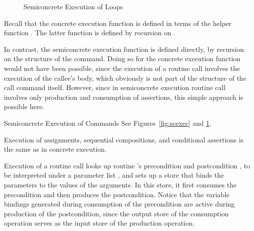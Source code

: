 \documentclass{CSML}
\theoremstyle{definition}\newtheorem{notation}[thm]{Notation}
\theoremstyle{plain}\newtheorem{satz}[thm]{Satz}
\begin{document}
\begin{figure}

\caption{Semiconcrete Execution of Loops}\label{fig:scexec-while}
\end{figure}

Recall that the concrete execution function  is 
defined in terms of the helper function . The 
latter function is defined by recursion on .

In contrast, the semiconcrete execution function 
 is defined directly, by recursion on the 
structure of the command. Doing so for the concrete execution 
function would not have been possible, since the execution of a 
routine call involves the execution of the callee's body, which 
obviously is not part of the structure of the call command 
itself. However, since in semiconcrete execution routine call 
involves only production and consumption of assertions, this 
simple approach is possible here.

\begin{defi}{Semiconcrete Execution of Commands}
See Figures~\ref{fig:scexec} and \ref{fig:scexec-while}.
\end{defi}

Execution of assignments, sequential compositions, and 
conditional assertions is the same as in concrete execution.

Execution of a routine call  looks up routine 
's precondition  and postcondition , to be 
interpreted under a parameter list , and sets up 
a store that binds the parameters to the values of the 
arguments. In this store, it first consumes the precondition 
and then produces the postcondition. Notice that the variable 
bindings generated during consumption of the precondition are 
active during production of the postcondition, since the output 
store of the consumption operation serves as the input store of 
the production operation. 
\end{document}
